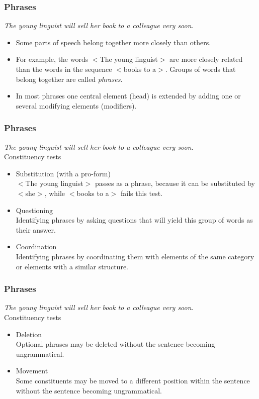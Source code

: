\documentclass[12pt, table]{beamer}
\begin{document}
\begin{frame}
\frametitle{Phrases}
\textit{The young linguist will sell her book to a colleague very soon.}\\
\begin{itemize}
\item Some parts of speech belong together more closely than others. 
\item For example, the words $<$The young linguist$>$ are more closely related than the words in the sequence $<$books to a$>$. Groups of words that belong together are called \textit{phrases}.
\item In most phrases one central element (head) is extended by adding one or several modifying elements (modifiers).
\end{itemize}
\end{frame} 

\begin{frame}
\frametitle{Phrases}
\textit{The young linguist will sell her book to a colleague very soon.}\\[.5cm]
Constituency tests
\begin{itemize}
\item Substitution (with a pro-form)\\
$<$The young linguist$>$ passes as a phrase, because it can be substituted by $<$she$>$, while $<$books to a$>$ fails this test. 
\item Questioning\\
Identifying phrases by asking questions that will yield this group of words as their answer.
\item Coordination\\
Identifying phrases by coordinating them with elements of the same category or elements with a similar structure.
\end{itemize}
\end{frame} 

\begin{frame}
\frametitle{Phrases}
\textit{The young linguist will sell her book to a colleague very soon.}\\[.5cm]
Constituency tests
\begin{itemize}
\item Deletion\\
Optional phrases may be deleted without the sentence becoming ungrammatical.
\item Movement\\
Some constituents may be moved to a different position within the sentence without the sentence becoming ungrammatical.
\end{itemize}
\end{frame} 
\end{document}
